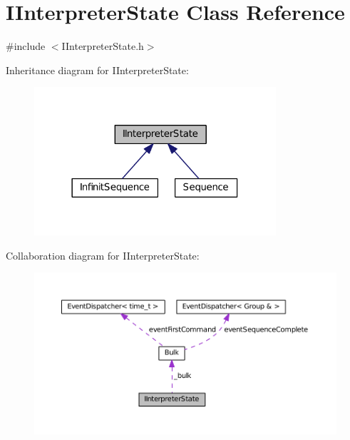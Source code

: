 \hypertarget{class_i_interpreter_state}{}\section{I\+Interpreter\+State Class Reference}
\label{class_i_interpreter_state}


{\ttfamily \#include $<$I\+Interpreter\+State.\+h$>$}



Inheritance diagram for I\+Interpreter\+State\+:
\nopagebreak
\begin{figure}[H]
\begin{center}
\leavevmode
\includegraphics[width=254pt]{class_i_interpreter_state__inherit__graph}
\end{center}
\end{figure}


Collaboration diagram for I\+Interpreter\+State\+:
\nopagebreak
\begin{figure}[H]
\begin{center}
\leavevmode
\includegraphics[width=350pt]{class_i_interpreter_state__coll__graph}
\end{center}
\end{figure}
